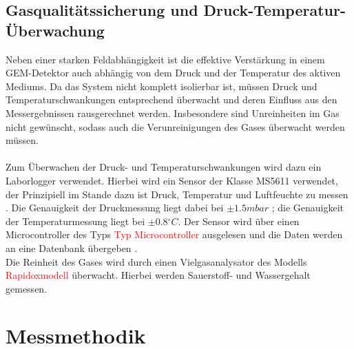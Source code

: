 		\subsection{Gasqualitätssicherung und Druck-Temperatur-Überwachung}
		Neben einer starken Feldabhängigkeit ist die effektive Verstärkung in einem GEM-Detektor auch abhängig von dem Druck und der Temperatur des aktiven Mediums. Da das System nicht komplett isolierbar ist, müssen Druck und Temperaturschwankungen entsprechend überwacht und deren Einfluss aus den Messergebnissen rausgerechnet werden. Insbesondere sind Unreinheiten im Gas nicht gewünscht, sodass auch die Verunreinigungen des Gases überwacht werden müssen.\\
		\\
		Zum Überwachen der Druck- und Temperaturschwankungen wird dazu ein Laborlogger verwendet. Hierbei wird ein Sensor der Klasse MS5611 verwendet, der Prinzipiell im Stande dazu ist Druck, Temperatur und Luftfeuchte zu messen \cite{LoggerSensor}. Die Genauigkeit der Druckmessung liegt dabei  bei $\pm 1.5 \si{mbar}$  ; die Genauigkeit der Temperaturmessung liegt bei $\pm 0.8 \si{^\circ C}$. Der Sensor wird über einen Microcontroller des Typs \textcolor{red}{Typ Microcontroller} ausgelesen und die Daten werden an eine Datenbank übergeben \cite{Hauer}.\\
		Die Reinheit des Gases wird durch einen Vielgasanalysator des Modells \textcolor{red}{Rapidoxmodell} überwacht. Hierbei werden Sauerstoff- und Wassergehalt gemessen. 
		

	\section{Messmethodik}
